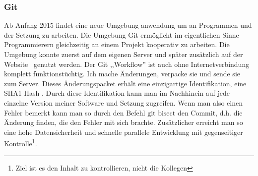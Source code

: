 \subsubsection*{Git}
Ab Anfang 2015 findet eine neue Umgebung anwendung um an
Programmen und der Setzung zu arbeiten.
Die Umgebung Git \cite{gitrepo}
ermöglicht im eigentlichen Sinne Programmierern gleichzeitig an
einem Projekt kooperativ zu arbeiten.
Die Umgebung konnte zuerst auf dem eigenen Server und später zusätzlich
auf der Website  \cite{github} genutzt werden.
Der Git ,,Workflow'' ist auch ohne Internetverbindung komplett funktionstüchtig.
Ich mache Änderungen, verpacke sie und sende sie zum Server.
Dieses Änderungspacket erhält eine einzigartige Identifikation, eine SHA1 Hash \cite{gitsha1}.
Durch diese Identifikation kann man im Nachhinein auf jede einzelne Version
meiner Software und Setzung zugreifen. Wenn man also einen Fehler bemerkt kann man so
durch den Befehl $\text{git bisect}$ den Commit, d.h. die Änderung finden, die den Fehler
mit sich brachte.
Zusätzlicher erreicht man so eine hohe Datensicherheit \cite{linussaves} und schnelle parallele Entwicklung mit gegenseitiger Kontrolle\footnote{Ziel ist es den Inhalt zu kontrollieren, nicht die Kollegen}.

